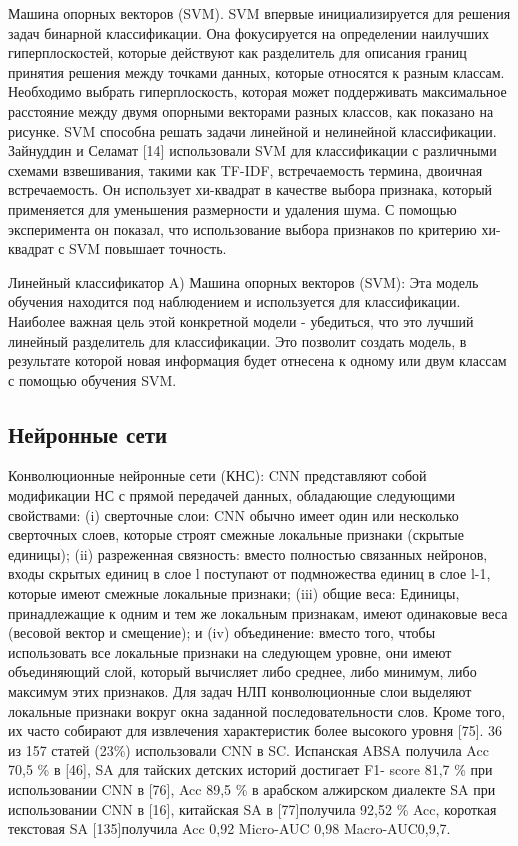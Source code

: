 Машина опорных векторов (SVM). SVM впервые инициализируется для решения задач
бинарной классификации. Она фокусируется на определении наилучших
гиперплоскостей, которые действуют как разделитель для описания границ принятия
решения между точками данных, которые относятся к разным классам. Необходимо
выбрать гиперплоскость, которая может поддерживать максимальное расстояние между
двумя опорными векторами разных классов, как показано на рисунке. SVM способна
решать задачи линейной и нелинейной классификации. Зайнуддин и Селамат [14]
использовали SVM для классификации с различными схемами взвешивания, такими как
TF-IDF, встречаемость термина, двоичная встречаемость. Он использует хи-квадрат
в качестве выбора признака, который применяется для уменьшения размерности и
удаления шума. С помощью эксперимента он показал, что использование выбора
признаков по критерию хи-квадрат с SVM повышает точность. \cite{article16}

Линейный классификатор
A) Машина опорных векторов (SVM): Эта модель обучения находится под наблюдением
и используется для классификации. Наиболее важная цель этой конкретной модели -
убедиться, что это лучший линейный разделитель для классификации. Это позволит
создать модель, в результате которой новая информация будет отнесена к одному
или двум классам с помощью обучения SVM.  \cite{article18}

\subsection{Нейронные сети}

Конволюционные нейронные сети (КНС): CNN представляют собой модификации НС с
прямой передачей данных, обладающие следующими свойствами: (i) сверточные слои:
CNN обычно имеет один или несколько сверточных слоев, которые строят смежные
локальные признаки (скрытые единицы); (ii) разреженная связность: вместо
полностью связанных нейронов, входы скрытых единиц в слое l поступают от
подмножества единиц в слое l-1, которые имеют смежные локальные признаки; (iii)
общие веса: Единицы, принадлежащие к одним и тем же локальным признакам, имеют
одинаковые веса (весовой вектор и смещение); и (iv) объединение: вместо того,
чтобы использовать все локальные признаки на следующем уровне, они имеют
объединяющий слой, который вычисляет либо среднее, либо минимум, либо максимум
этих признаков. Для задач НЛП конволюционные слои выделяют локальные признаки
вокруг окна заданной последовательности слов. Кроме того, их часто собирают для
извлечения характеристик более высокого уровня [75]. 36 из 157 статей (23\%)
использовали CNN в SC. Испанская ABSA получила Acc 70,5 \% в [46], SA для тайских
детских историй достигает F1- score 81,7 \% при использовании CNN в [76], Acc
89,5 \% в арабском алжирском диалекте SA при использовании CNN в [16], китайская
SA в [77]получила 92,52 \% Acc, короткая текстовая SA [135]получила Acc 0,92
Micro-AUC 0,98 Macro-AUC0,9,7. \cite{article2}


